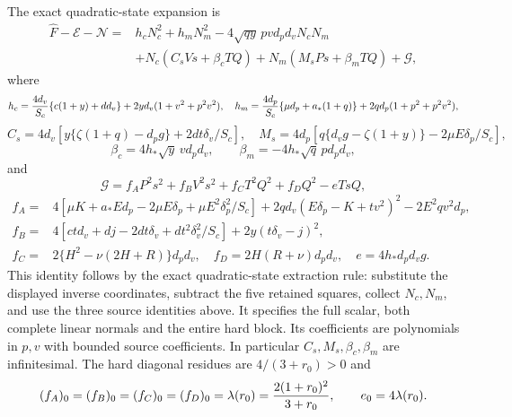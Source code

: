 The exact quadratic-state expansion is
\[
 \begin{split}
 \widehat F-\mathcal E-\mathcal N={}&h_cN_c^2+h_mN_m^2
 -4\sqrt{qy}\,pv d_pd_vN_cN_m\\
 &+N_c(C_sVs+\beta_cTQ)+N_m(M_sPs+\beta_mTQ)+\mathcal G,
 \end{split}
\]
where
\[
 h_c={4d_v\over S_c}\{c(1+y)+dd_v\}+2yd_v(1+v^2+p^2v^2),
\quad
 h_m={4d_p\over S_c}\{\mu d_p+a_*(1+q)\}+2qd_p(1+p^2+p^2v^2),
\]
\[
 C_s=4d_v[y\{\zeta(1+q)-d_pg\}+2dt\delta_v/S_c],
 \quad M_s=4d_p[q\{d_vg-\zeta(1+y)\}-2\mu E\delta_p/S_c],
\]
\[
 \beta_c=4h_*\sqrt y\,v d_pd_v,
 \qquad\beta_m=-4h_*\sqrt q\,p d_pd_v,
\]
and
\[
 \mathcal G=f_AP^2s^2+f_BV^2s^2+f_CT^2Q^2+f_DQ^2-eTsQ,
\]
\[
 \begin{split}
 f_A={}&4[\mu K+a_*Ed_p-2\mu E\delta_p
                   +\mu E^2\delta_p^2/S_c]
       +2qd_v(E\delta_p-K+tv^2)^2-2E^2qv^2d_p,\\
 f_B={}&4[ctd_v+dj-2dt\delta_v+dt^2\delta_v^2/S_c]
                   +2y(t\delta_v-j)^2,\\
 f_C={}&2\{H^2-\nu(2H+R)\}d_pd_v,\quad
 f_D=2H(R+\nu)d_pd_v,\quad e=4h_*d_pd_vg.
 \end{split}
\]
This identity follows by the exact quadratic-state extraction rule:
substitute the displayed inverse coordinates, subtract the five
retained squares, collect $N_c,N_m$, and use the three source identities
above. It specifies the full scalar, both complete linear normals and
the entire hard block. Its coefficients are polynomials in $p,v$ with
bounded source coefficients. In particular $C_s,M_s,\beta_c,\beta_m$
are infinitesimal. The hard diagonal residues are $4/(3+r_0)>0$ and
\[
 (f_A)_0=(f_B)_0=(f_C)_0=(f_D)_0
 =\lambda(r_0)={2(1+r_0)^2\over3+r_0},\qquad e_0=4\lambda(r_0).
\]

